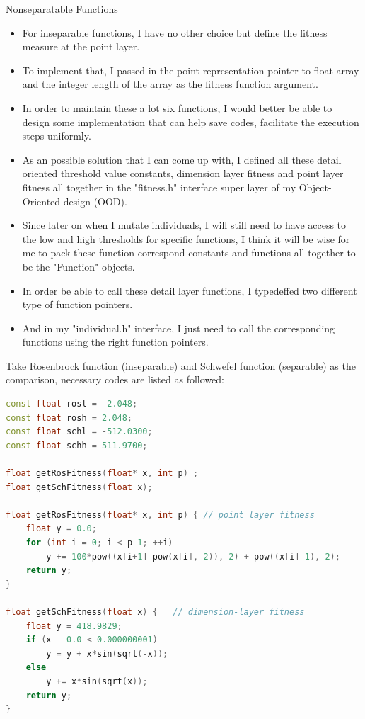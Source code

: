 \documentclass[b5paper,11pt, abstraction, titlepage]{scrartcl}
\begin{document}
\begin{CJK}{UTF8}{gbsn}
\begin{description}
\item{Nonseparatable Functions}
\begin{itemize}
  \itemsep=-3pt
\item For inseparable functions, I have no other choice but define the fitness measure at the point layer.
\item To implement that, I passed in the point representation pointer to float array and the integer length of the array as the fitness function argument.
\item In order to maintain these a lot six functions, I would better be able to design some implementation that can help save codes, facilitate the execution steps uniformly.
\item As an possible solution that I can come up with, I defined all these detail oriented threshold value constants, dimension layer fitness and point layer fitness all together in the "fitness.h" interface super layer of my Object-Oriented design (OOD).
\item Since later on when I mutate individuals, I will still need to have access to the low and high thresholds for specific functions, I think it will be wise for me to pack these function-correspond constants and functions all together to be the "Function" objects.
\item In order be able to call these detail layer functions, I typedeffed two different type of function pointers.
\item And in my "individual.h" interface, I just need to call the corresponding functions using the right function pointers. 
\end{itemize}
Take Rosenbrock function (inseparable) and Schwefel function (separable) as the comparison, necessary codes are listed as followed:
\begin{lstlisting}[language=c++]
const float rosl = -2.048;
const float rosh = 2.048;
const float schl = -512.0300; 
const float schh = 511.9700; 

float getRosFitness(float* x, int p) ;
float getSchFitness(float x);

float getRosFitness(float* x, int p) { // point layer fitness
    float y = 0.0;
    for (int i = 0; i < p-1; ++i) 
        y += 100*pow((x[i+1]-pow(x[i], 2)), 2) + pow((x[i]-1), 2);
    return y;
}

float getSchFitness(float x) {   // dimension-layer fitness
    float y = 418.9829;
    if (x - 0.0 < 0.000000001) 
	    y = y + x*sin(sqrt(-x));
    else
	    y += x*sin(sqrt(x));
    return y;
}


\end{lstlisting}
\end{description}
\end{CJK}
\end{document}
